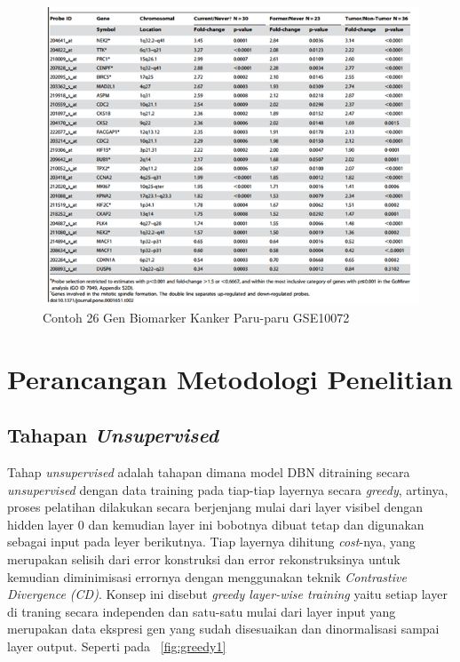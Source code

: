 \begin{figure}
	\centering
	\includegraphics[width=1.1\textwidth]
		{pics/biomarker.png}
	\caption{Contoh 26 Gen Biomarker Kanker Paru-paru GSE10072 \citep{landi2008gene}}
	\label{fig:biomarker}
\end{figure}


\section{Perancangan Metodologi Penelitian}

\subsection{Tahapan \textit{Unsupervised}}
Tahap \textit{unsupervised} adalah tahapan dimana model DBN ditraining secara \textit{unsupervised} dengan data training pada tiap-tiap layernya secara \textit{greedy}, artinya, proses pelatihan dilakukan secara berjenjang mulai dari layer visibel dengan hidden layer 0 dan kemudian layer ini bobotnya dibuat tetap dan digunakan sebagai input pada leyer berikutnya. Tiap layernya dihitung \textit{cost}-nya, yang merupakan selisih dari error konstruksi dan error rekonstruksinya \citep{hinton2006fast} untuk kemudian diminimisasi errornya dengan menggunakan teknik \textit{Contrastive Divergence (CD)}. Konsep ini disebut \textit{greedy layer-wise training} yaitu setiap layer di traning secara independen dan satu-satu mulai dari layer input yang merupakan data ekspresi gen yang sudah disesuaikan dan dinormalisasi sampai layer output. Seperti pada \pic~\ref{fig:greedy1}

